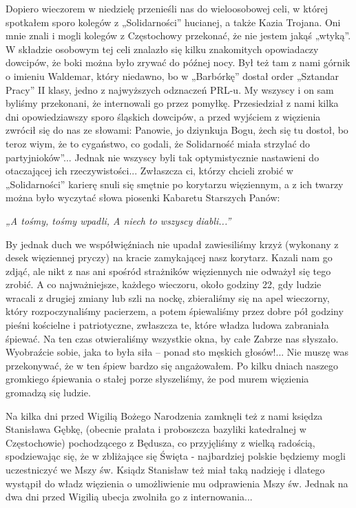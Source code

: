 Dopiero wieczorem w niedzielę przenieśli nas do wieloosobowej celi, w której spotkałem sporo kolegów z „Solidarności” hucianej, a także Kazia Trojana. Oni mnie znali i mogli kolegów z Częstochowy przekonać, że nie jestem jakąś „wtyką”. W składzie osobowym tej celi znalazło się kilku znakomitych opowiadaczy dowcipów, że boki można było zrywać do późnej nocy. Był też tam z nami górnik o imieniu Waldemar, który niedawno, bo w „Barbórkę” dostał order „Sztandar Pracy” II klasy, jedno z najwyższych odznaczeń PRL-u. My wszyscy i on sam byliśmy przekonani, że internowali go przez pomyłkę. Przesiedział z nami kilka dni opowiedziawszy sporo śląskich dowcipów, a przed wyjściem z więzienia zwrócił się do nas ze słowami: Panowie, jo dziynkuja Bogu, żech się tu dostoł, bo teroz wiym, że to cygaństwo, co godali, że Solidarność miała strzylać do partyjnioków”...
Jednak nie wszyscy byli tak optymistycznie nastawieni do otaczającej ich rzeczywistości... Zwłaszcza ci, którzy chcieli zrobić w „Solidarności” karierę snuli się smętnie po korytarzu więziennym, a z ich twarzy można było wyczytać słowa piosenki Kabaretu Starszych Panów: 
\begin{center}
\textit{„A tośmy, tośmy wpadli, 
A niech to wszyscy diabli...” }
\end{center}
By jednak duch we współwięźniach nie upadał zawiesiliśmy krzyż (wykonany z desek więziennej pryczy) na kracie zamykającej nasz korytarz. Kazali nam go zdjąć, ale nikt z nas ani spośród strażników więziennych nie odważył się tego zrobić. A co najważniejsze, każdego wieczoru, około godziny 22, gdy ludzie wracali z drugiej zmiany lub szli na nockę, zbieraliśmy się na apel wieczorny, który rozpoczynaliśmy pacierzem, a potem śpiewaliśmy przez dobre pół godziny pieśni kościelne i patriotyczne, zwłaszcza te, które władza ludowa zabraniała śpiewać. Na ten czas otwieraliśmy wszystkie okna, by całe Zabrze nas słyszało. Wyobraźcie sobie, jaka to była siła – ponad sto męskich głosów!... Nie muszę was przekonywać, że w ten śpiew bardzo się angażowałem. Po kilku dniach naszego gromkiego śpiewania o stałej porze słyszeliśmy, że pod murem więzienia gromadzą się ludzie. 

Na kilka dni przed Wigilią Bożego Narodzenia zamknęli też z nami księdza Stanisława Gębkę, (obecnie prałata i proboszcza bazyliki katedralnej w Częstochowie) pochodzącego z Będusza, co przyjęliśmy z wielką radością, spodziewając się, że w zbliżające się Święta - najbardziej polskie będziemy mogli uczestniczyć we Mszy św. Ksiądz Stanisław też miał taką nadzieję i dlatego wystąpił do władz więzienia o umożliwienie mu odprawienia  Mszy św. Jednak na dwa dni przed Wigilią ubecja zwolniła go z internowania...

